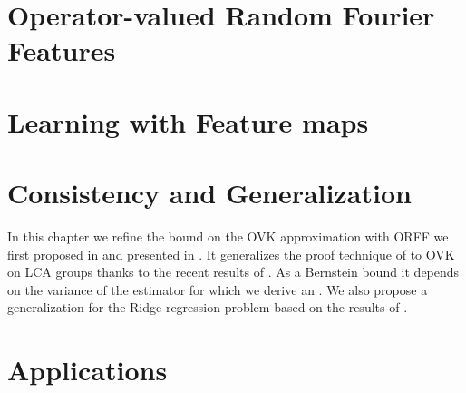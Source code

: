 
\chapter{Operator-valued Random Fourier Features}
\label{ch:operator-valued_random_fourier_features}


\chapter{Learning with Feature maps}
\label{ch:learning operator-valued_random_fourier_features}


\chapter{Consistency and Generalization} %
\label{ch:concistency_and_generalization}
\bigskip
\begin{justify}
In this chapter we refine the bound on the \ac{OVK} approximation with
\ac{ORFF} we first proposed in \cite{brault2016random} and presented in
\cite{braultborne}. It generalizes the proof technique of \citet{Rahimi2007} to
\ac{OVK} on \ac{LCA} groups thanks to the recent results of
\citet{sutherland2015, tropp2015introduction, minsker2011some,
koltchinskii2013remark}. As a Bernstein bound it depends on the variance of the
estimator for which we derive an . We also propose a
generalization for the Ridge regression problem based on the results of
\citet{rahimi2009weighted, maurer2016vector}.
\end{justify}
\minitoc


\chapter{Applications} %
\label{ch:applications}

